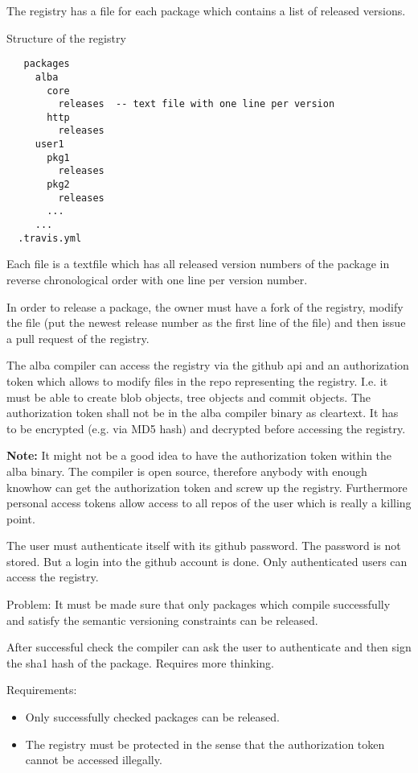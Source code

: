 The registry has a file for each package which contains a list of released
versions.

\noindent Structure of the registry
{\small
\begin{verbatim}
   packages
     alba
       core
         releases  -- text file with one line per version
       http
         releases
     user1
       pkg1
         releases
       pkg2
         releases
       ...
     ...
  .travis.yml
\end{verbatim}
}
Each file  is a textfile which has all released version numbers
of the package in reverse chronological order with one line per version
number.

In order to release a package, the owner must have a fork of the registry,
modify the file  (put the newest release
number as the first line of the file) and then issue a pull request of the
registry.








The alba compiler can access the registry via the github api and an
authorization token which allows to modify files in the repo representing the
registry. I.e. it must be able to create blob objects, tree objects and commit
objects. The authorization token shall not be in the alba compiler binary
as cleartext. It has to be encrypted (e.g. via MD5 hash) and decrypted before
accessing the registry.

{\bf Note:} It might not be a good idea to have the authorization token within
the alba binary. The compiler is open source, therefore anybody with enough
knowhow can get the authorization token and screw up the registry. Furthermore
personal access tokens allow access to all repos of the user which is really a
killing point.

The user must authenticate itself with its github password. The password is
not stored. But a login into the github account is done. Only authenticated
users can access the registry.

Problem: It must be made sure that only packages which compile successfully
and satisfy the semantic versioning constraints can be released.

After successful check the compiler can ask the user to authenticate and then
sign the sha1 hash of the package. Requires more thinking.

Requirements:
\begin{itemize}
\item Only successfully checked packages can be released.
\item The registry must be protected in the sense that the authorization token
  cannot be accessed illegally.
\end{itemize}




